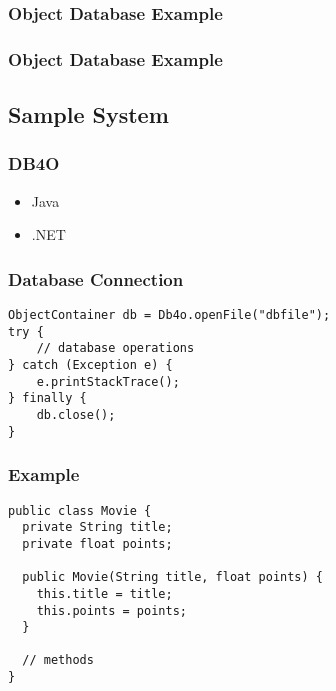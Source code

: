 \documentclass[dvipsnames]{beamer}
\theoremstyle{plain}
\begin{document}
\begin{frame}
  \frametitle{Object Database Example}

  \begin{example}
    \begin{center}
    \end{center}
  \end{example}
\end{frame}

\begin{frame}
  \frametitle{Object Database Example}

  \begin{example}
    \begin{center}
    \end{center}
  \end{example}
\end{frame}

\subsection{Sample System}

\begin{frame}
  \frametitle{DB4O}

  \begin{itemize}
    \item Java
    \item .NET
  \end{itemize}
\end{frame}

\begin{frame}[fragile]
  \frametitle{Database Connection}

  \begin{example}
    \begin{lstlisting}
ObjectContainer db = Db4o.openFile("dbfile");
try {
    // database operations
} catch (Exception e) {
    e.printStackTrace();
} finally {
    db.close();
}
    \end{lstlisting}
  \end{example}
\end{frame}

\begin{frame}[fragile]
  \frametitle{Example}

  \begin{example}
    \begin{lstlisting}
public class Movie {
  private String title;
  private float points;

  public Movie(String title, float points) {
    this.title = title;
    this.points = points;
  }

  // methods
}
    \end{lstlisting}
  \end{example}
\end{frame}
\end{document}
